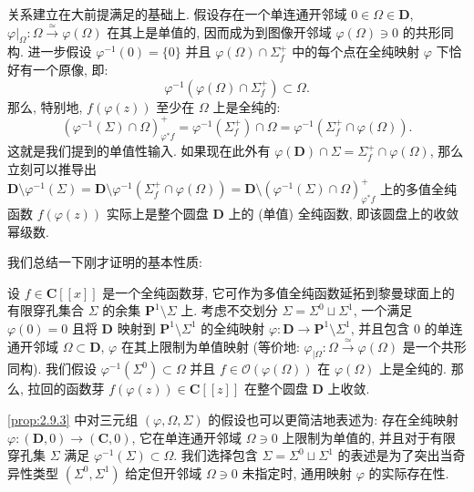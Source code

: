 关系建立在大前提满足的基础上. 假设存在一个单连通开邻域 \(0 \in \Omega \in \mathbf{D}\), \(\varphi|_{\Omega}: \Omega \xrightarrow{\simeq} \varphi(\Omega)\) 在其上是单值的, 因而成为到图像开邻域 \(\varphi(\Omega) \ni 0\) 的共形同构. 进一步假设 \(\varphi^{-1}(0) = \{0\}\) 并且 \(\varphi(\Omega) \cap \Sigma_f^+\) 中的每个点在全纯映射 \(\varphi\) 下恰好有一个原像, 即:
\[ \varphi^{-1}\left(\varphi(\Omega)\cap\Sigma_f^+\right)\subset\Omega. \]
那么, 特别地, \(f(\varphi(z))\) 至少在 \(\Omega\) 上是全纯的:
\begin{equation}\label{eq:2.9.2}
\left(\varphi^{-1}\left(\Sigma\right)\cap\Omega\right)_{\varphi^{*}f}^{+}=\varphi^{-1}\left(\Sigma_{f}^{+}\right)\cap\Omega=\varphi^{-1}\left(\Sigma_{f}^{+}\cap\varphi(\Omega)\right).
\end{equation}
这就是我们提到的单值性输入. 如果现在此外有 \(\varphi(\mathbf{D}) \cap \Sigma = \Sigma_f^+ \cap \varphi(\Omega)\), 那么立刻可以推导出 \(\mathbf{D} \setminus \varphi^{-1}(\Sigma) = \mathbf{D} \setminus \varphi^{-1}\left(\Sigma_f^+ \cap \varphi(\Omega)\right) = \mathbf{D} \setminus \left(\varphi^{-1}(\Sigma) \cap \Omega\right)_{\varphi^*f}^+\) 上的多值全纯函数 \(f(\varphi(z))\) 实际上是整个圆盘 \(\mathbf{D}\) 上的 (单值) 全纯函数, 即该圆盘上的收敛幂级数.

我们总结一下刚才证明的基本性质:

\begin{proposition}\label{prop:2.9.3}
设 \(f \in \mathbf{C}[\! [x]\!]\) 是一个全纯函数芽, 它可作为多值全纯函数延拓到黎曼球面上的有限穿孔集合 \(\Sigma\) 的余集 \(\mathbf{P}^1 \setminus \Sigma\) 上. 考虑不交划分 \(\Sigma = \Sigma^0 \sqcup \Sigma^1\), 一个满足 \(\varphi(0) = 0\) 且将 \(\mathbf{D}\) 映射到 \(\mathbf{P}^1 \setminus \Sigma^1\) 的全纯映射 \(\varphi : \mathbf{D} \to \mathbf{P}^1 \setminus \Sigma^1\), 并且包含 \(0\) 的单连通开邻域 \(\Omega \subset \mathbf{D}\), \(\varphi\) 在其上限制为单值映射 (等价地: \(\varphi_{|\Omega} : \Omega \xrightarrow{\simeq} \varphi(\Omega)\) 是一个共形同构). 我们假设 \(\varphi^{-1}\left(\Sigma^0\right) \subset \Omega\) 并且 \(f \in \mathcal{O}(\varphi(\Omega))\) 在 \(\varphi(\Omega)\) 上是全纯的.
那么, 拉回的函数芽 \(f(\varphi(z)) \in \mathbf{C}[\! [z]\!]\) 在整个圆盘 \(\mathbf{D}\) 上收敛.
\end{proposition}

\begin{remark}\label{rem:2.9.4}
\autoref{prop:2.9.3} 中对三元组 \((\varphi, \Omega, \Sigma)\) 的假设也可以更简洁地表述为: 存在全纯映射 \(\varphi: (\mathbf{D},0) \to (\mathbf{C},0)\), 它在单连通开邻域 \(\Omega \ni 0\) 上限制为单值的, 并且对于有限穿孔集 \(\Sigma\) 满足 \(\varphi^{-1}(\Sigma) \subset \Omega\). 我们选择包含 \(\Sigma = \Sigma^0 \sqcup \Sigma^1\) 的表述是为了突出当奇异性类型 \((\Sigma^0, \Sigma^1)\) 给定但开邻域 \(\Omega \ni 0\) 未指定时, 通用映射 \(\varphi\) 的实际存在性.
\end{remark}

